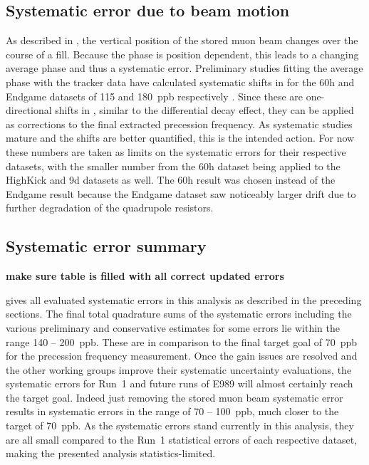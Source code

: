 \subsection{Systematic error due to beam motion}


As described in , the vertical position of the stored muon beam changes over the course of a fill. Because the \gmtwo phase is position dependent, this leads to a changing average phase and thus a systematic error. Preliminary studies fitting the average \gmtwo phase with the tracker data have calculated systematic shifts in \wa for the 60h and Endgame datasets of \SI{115}{} and \SI{180}{ppb} respectively \cite{BadResistorsVolodya}. Since these are one-directional shifts in \wa, similar to the differential decay effect, they can be applied as corrections to the final extracted precession frequency. As systematic studies mature and the shifts are better quantified, this is the intended action. For now these numbers are taken as limits on the systematic errors for their respective datasets, with the smaller number from the 60h dataset being applied to the HighKick and 9d datasets as well. The 60h result was chosen instead of the Endgame result because the Endgame dataset saw noticeably larger drift due to further degradation of the quadrupole resistors.




\subsection{Systematic error summary}

\textbf{make sure table is filled with all correct updated errors}

 gives all evaluated systematic errors in this analysis as described in the preceding sections. The final total quadrature sums of the systematic errors including the various preliminary and conservative estimates for some errors lie within the range \SI{140}{} -- \SI{200}{ppb}. These are in comparison to the final target goal of \SI{70}{ppb} for the precession frequency measurement. Once the gain issues are resolved and the other working groups improve their systematic uncertainty evaluations, the systematic errors for Run~1 and future runs of E989 will almost certainly reach the target goal. Indeed just removing the stored muon beam systematic error results in systematic errors in the range of \SI{70}{} -- \SI{100}{ppb}, much closer to the target of \SI{70}{ppb}. As the systematic errors stand currently in this analysis, they are all small compared to the Run~1 statistical errors of each respective dataset, making the presented analysis statistics-limited. 



